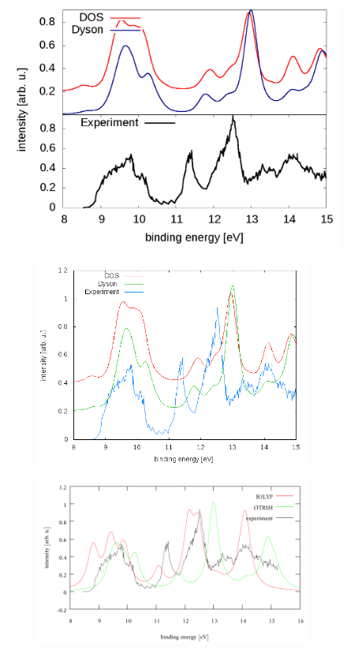 \begin{figure}
   \includegraphics[width=\textwidth]{Figures/Sulphur/Sulphur}
\end{figure}
\begin{figure}
\begin{subfigure}{0.5\textwidth}
   \includegraphics[width=\textwidth]{Figures/Sulphur/S8_vapour}
\end{subfigure}
\begin{subfigure}{0.5\textwidth}
   \includegraphics[width=\textwidth]{Figures/Sulphur/compS8}
\end{subfigure}
\end{figure}
